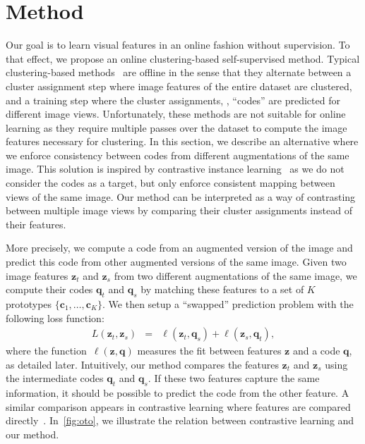 
\section{Method}

Our goal is to learn visual features in an online fashion without supervision.
To that effect, we propose an online clustering-based self-supervised method.
Typical clustering-based methods~\cite{asano2019self,caron2018deep} are offline in the sense that they alternate between a cluster assignment step where image features of the entire dataset are clustered, and a training step where the cluster assignments, \ie, ``codes'' are predicted for different image views.
Unfortunately, these methods are not suitable for online learning as they require multiple passes over the dataset to compute the image features necessary for clustering.
In this section, we describe an alternative where we enforce consistency between codes from different augmentations of the same image.
This solution is inspired by contrastive instance learning~\cite{wu2018unsupervised} as we do not consider the codes as a target, but only enforce consistent mapping between views of the same image.
Our method can be interpreted as a way of contrasting between multiple image views by comparing their cluster assignments instead of their features.

More precisely, we compute a code from an augmented version of the image and predict this code from other augmented versions of the same image.
Given two image features $\mathbf{z}_t$ and $\mathbf{z}_s$ from two different augmentations of the same image, we compute their codes $\mathbf{q}_t$ and $\mathbf{q}_s$ by matching these features to a set of $K$ prototypes $\{\mathbf{c}_1,\dots, \mathbf{c}_K\}$.
We then setup a ``swapped'' prediction problem with the following loss function:
\begin{eqnarray}
L(\mathbf{z}_t, \mathbf{z}_s) & = &\ell(\mathbf{z}_t, \mathbf{q}_s) + \ell(\mathbf{z}_s, \mathbf{q}_t),
\label{eq:twoviews}
\end{eqnarray}
where the function~$\ell({\mathbf z},{\mathbf q})$ measures the fit between features ${\mathbf z}$ and a code ${\mathbf q}$, as detailed later.  
Intuitively, our method compares the features $\mathbf{z}_t$ and $\mathbf{z}_s$ using the intermediate codes $\mathbf{q}_t$ and $\mathbf{q}_s$. 
If these two features capture the same information, it should be possible to predict the code from the other feature.
A similar comparison appears in contrastive learning where features are compared directly~\cite{wu2018unsupervised}. 
In~\cref{fig:oto}, we illustrate the relation between contrastive learning and our method.

